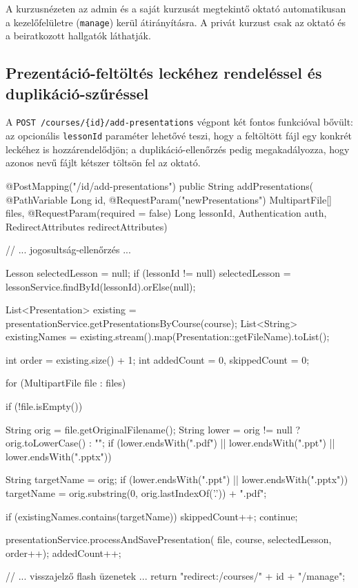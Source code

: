 A kurzusnézeten az admin és a saját kurzusát megtekintő oktató automatikusan a kezelőfelületre (\texttt{manage}) kerül átirányításra. A privát kurzust csak az oktató és a beiratkozott hallgatók láthatják.

\subsection{Prezentáció-feltöltés leckéhez rendeléssel és duplikáció-szűréssel}

A \texttt{POST /courses/\{id\}/add-presentations} végpont két fontos funkcióval bővült: az opcionális \texttt{lessonId} paraméter lehetővé teszi, hogy a feltöltött fájl egy konkrét leckéhez is hozzárendelődjön; a duplikáció-ellenőrzés pedig megakadályozza, hogy azonos nevű fájlt kétszer töltsön fel az oktató.

\begin{java}[caption={Prezentáció-feltöltés duplikáció-szűréssel és leckéhez rendeléssel},label=java:addpresent]
@PostMapping("/{id}/add-presentations")
public String addPresentations(
        @PathVariable Long id,
        @RequestParam("newPresentations") MultipartFile[] files,
        @RequestParam(required = false) Long lessonId,
        Authentication auth,
        RedirectAttributes redirectAttributes) {

    // ... jogosultság-ellenőrzés ...

    Lesson selectedLesson = null;
    if (lessonId != null) {
        selectedLesson = lessonService.findById(lessonId).orElse(null);
    }

    List<Presentation> existing =
            presentationService.getPresentationsByCourse(course);
    List<String> existingNames =
            existing.stream().map(Presentation::getFileName).toList();

    int order = existing.size() + 1;
    int addedCount = 0, skippedCount = 0;

    for (MultipartFile file : files) {
        if (!file.isEmpty()) {
            String orig  = file.getOriginalFilename();
            String lower = orig != null ? orig.toLowerCase() : "";
            if (lower.endsWith(".pdf") || lower.endsWith(".ppt")
                    || lower.endsWith(".pptx")) {

                String targetName = orig;
                if (lower.endsWith(".ppt") || lower.endsWith(".pptx"))
                    targetName = orig.substring(0,
                            orig.lastIndexOf('.')) + ".pdf";

                if (existingNames.contains(targetName)) {
                    skippedCount++;
                    continue;
                }

                presentationService.processAndSavePresentation(
                        file, course, selectedLesson, order++);
                addedCount++;
            }
        }
    }
    // ... visszajelző flash üzenetek ...
    return "redirect:/courses/" + id + "/manage";
}
\end{java}

